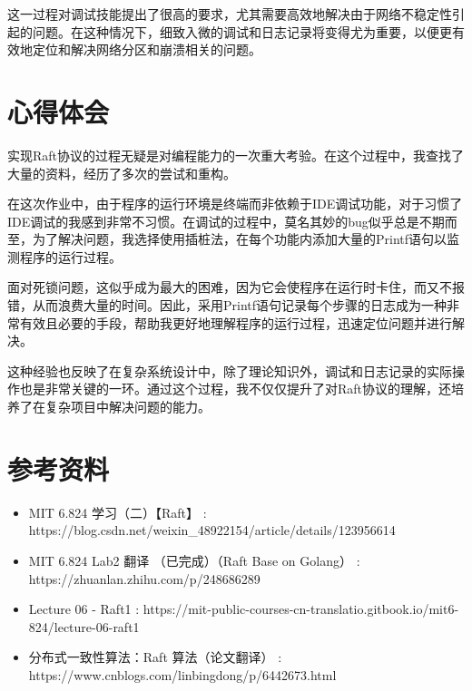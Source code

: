 \documentclass[]{article}
\begin{document}
	这一过程对调试技能提出了很高的要求，尤其需要高效地解决由于网络不稳定性引起的问题。在这种情况下，细致入微的调试和日志记录将变得尤为重要，以便更有效地定位和解决网络分区和崩溃相关的问题。
	
	\section{心得体会}
	实现Raft协议的过程无疑是对编程能力的一次重大考验。在这个过程中，我查找了大量的资料，经历了多次的尝试和重构。
	
	在这次作业中，由于程序的运行环境是终端而非依赖于IDE调试功能，对于习惯了IDE调试的我感到非常不习惯。在调试的过程中，莫名其妙的bug似乎总是不期而至，为了解决问题，我选择使用插桩法，在每个功能内添加大量的Printf语句以监测程序的运行过程。
	
	面对死锁问题，这似乎成为最大的困难，因为它会使程序在运行时卡住，而又不报错，从而浪费大量的时间。因此，采用Printf语句记录每个步骤的日志成为一种非常有效且必要的手段，帮助我更好地理解程序的运行过程，迅速定位问题并进行解决。
	
	这种经验也反映了在复杂系统设计中，除了理论知识外，调试和日志记录的实际操作也是非常关键的一环。通过这个过程，我不仅仅提升了对Raft协议的理解，还培养了在复杂项目中解决问题的能力。
	
	\section{参考资料}
	\begin{itemize}
		\item MIT 6.824 学习（二）【Raft】 : https://blog.csdn.net/weixin\_48922154/article/details/123956614
		\item MIT 6.824 Lab2 翻译 （已完成）（Raft Base on Golang） : https://zhuanlan.zhihu.com/p/248686289
		\item Lecture 06 - Raft1 : https://mit-public-courses-cn-translatio.gitbook.io/mit6-824/lecture-06-raft1 
		\item 分布式一致性算法：Raft 算法（论文翻译） : https://www.cnblogs.com/linbingdong/p/6442673.html
	\end{itemize}
	
\end{document}
